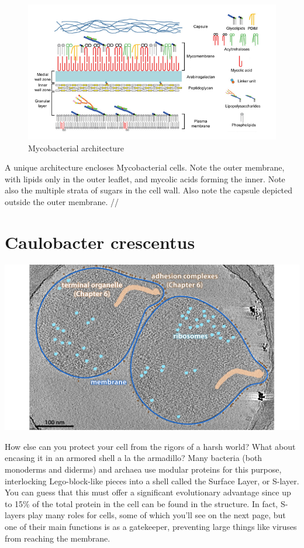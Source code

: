 \documentclass[]{tufte-book}
\begin{document}
\begin{figure}
\includegraphics{img/02_schematic/2_5_1_Mycobacteria} \caption[Mycobacterial architecture]{Mycobacterial architecture}\label{fig:2-5-1}
\end{figure}

A unique architecture encloses Mycobacterial cells. Note the outer
membrane, with lipids only in the outer leaflet, and mycolic acids
forming the inner. Note also the multiple strata of sugars in the cell
wall. Also note the capsule depicted outside the outer membrane. //

\section{Caulobacter crescentus}\label{caulobacter-crescentus}

\includegraphics{img/02_static/2_1_Mgenitalium}

How else can you protect your cell from the rigors of a harsh world?
What about encasing it in an armored shell a la the armadillo? Many
bacteria (both monoderms and diderms) and archaea use modular proteins
for this purpose, interlocking Lego-block-like pieces into a shell
called the Surface Layer, or S-layer. You can guess that this must offer
a significant evolutionary advantage since up to 15\% of the total
protein in the cell can be found in the structure. In fact, S-layers
play many roles for cells, some of which you'll see on the next page,
but one of their main functions is as a gatekeeper, preventing large
things like viruses from reaching the membrane.
\end{document}
